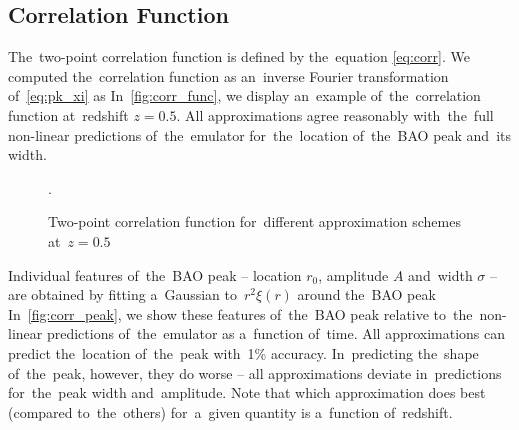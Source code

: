 \subsection{Correlation Function}
\label{sec:corr}
The~two-point correlation function is defined by the~equation \eqref{eq:corr}. We computed the~correlation function as an~inverse Fourier transformation of~\eqref{eq:pk_xi} as
In~\autoref{fig:corr_func}, we display an~example of~the~correlation function at~redshift $z=0.5$. All approximations agree reasonably with~the~full non-linear predictions of~the~emulator for~the~location of~the~BAO peak and~its width.
\begin{figure}[bt]
\centering
	\begin{subfigure}{0.9\textwidth}
	\end{subfigure}
	\begin{subfigure}{0.9\textwidth}
		\centering
	\end{subfigure}
	\caption{Two-point correlation function for~different approximation schemes at~$z=0.5$}.
	\label{fig:corr_func}
\end{figure}

Individual features of~the~BAO peak -- location $r_0$, amplitude $A$ and~width $\sigma$ -- are obtained by fitting a~Gaussian to~$r^2\xi(r)$ around the~BAO peak
In~\autoref{fig:corr_peak}, we show these features of~the~BAO peak relative to~the~non-linear predictions of~the~emulator as a~function of~time. All approximations can predict the~location of~the~peak with~1\% accuracy. In~predicting the~shape of~the~peak, however, they do worse -- all approximations deviate in~predictions for~the~peak width and~amplitude. Note that which approximation does best (compared to~the~others) for~a~given quantity is a~function of~redshift.



